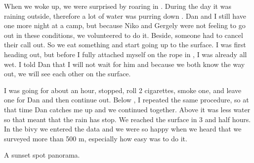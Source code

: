 

When we woke up, we were surprised by roaring in . During
the day it was raining outside, therefore a lot of water was purring
down . Dan and I still have one more night at a camp, but
because Niko and Gergely were not feeling to go out in these conditions,
we volunteered to do it. Beside, someone had to cancel their call out.
So we eat something and start going up to the surface. I was first
heading out, but before I fully attached myself on the rope in
, I was already all wet. I told Dan that I will not wait
for him and because we both know the way out, we will see each other on
the surface.


I was going for about an hour, stopped, roll 2 cigarettes,
smoke one, and leave one for Dan and then continue out. Below
, I repeated the same procedure, so at that time Dan catches
me up and we continued together. Above  it was less water so
that meant that the rain has stop. We reached the surface in 3 and half
hours. In the bivy we entered the data and we were so happy when we
heard that we surveyed more than 500 m, especially how easy was to do
it.


\begin{pagefigure}
\checkoddpage \ifoddpage \forcerectofloat \else \forceversofloat \fi
{}
\caption{A sunset spot panorama. } \label{sunset panorama}
\end{pagefigure}









